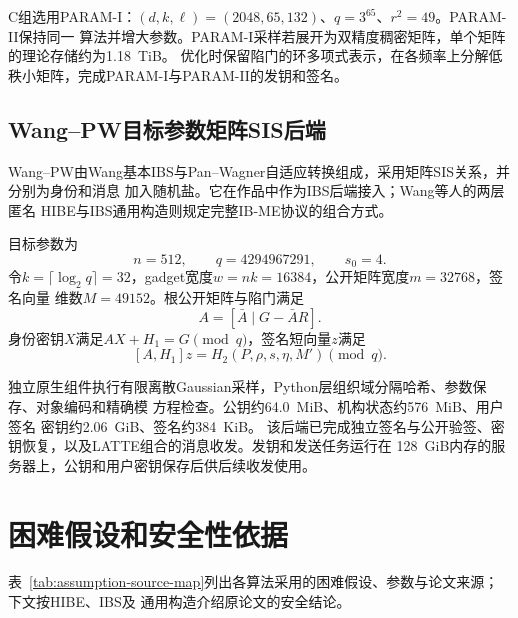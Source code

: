 C组选用PARAM-I：$(d,k,\ell)=(2048,65,132)$、$q=3^{65}$、$r^2=49$。PARAM-II保持同一
算法并增大参数。PARAM-I采样若展开为双精度稠密矩阵，单个矩阵的理论存储约为1.18~TiB。
优化时保留陷门的环多项式表示，在各频率上分解低秩小矩阵，完成PARAM-I与PARAM-II的发钥和签名。

\subsection{Wang--PW目标参数矩阵SIS后端}

Wang--PW由Wang基本IBS与Pan--Wagner自适应转换组成，采用矩阵SIS关系，并分别为身份和消息
加入随机盐\cite{wang2024ibme,pan2021ibs}。它在作品中作为IBS后端接入；Wang等人的两层匿名
HIBE与IBS通用构造则规定完整IB-ME协议的组合方式。

目标参数为
\[
 n=512,\qquad q=4294967291,\qquad s_0=4.
\]
令$k=\lceil\log_2q\rceil=32$，gadget宽度$w=nk=16384$，公开矩阵宽度$m=32768$，签名向量
维数$M=49152$。根公开矩阵与陷门满足
\[
 A=[\bar A\mid G-\bar AR].
\]
身份密钥$X$满足$AX+H_1=G\pmod q$，签名短向量$z$满足
\[
 [A,H_1]z=H_2(P,\rho,s,\eta,M')\pmod q.
\]

独立原生组件执行有限离散Gaussian采样，Python层组织域分隔哈希、参数保存、对象编码和精确模
方程检查。公钥约64.0~MiB、机构状态约576~MiB、用户签名
密钥约2.06~GiB、签名约384~KiB。
该后端已完成独立签名与公开验签、密钥恢复，以及LATTE组合的消息收发。发钥和发送任务运行在
128~GiB内存的服务器上，公钥和用户密钥保存后供后续收发使用。

\section{困难假设和安全性依据}

表~\ref{tab:assumption-source-map}列出各算法采用的困难假设、参数与论文来源；下文按HIBE、IBS及
通用构造介绍原论文的安全结论。

